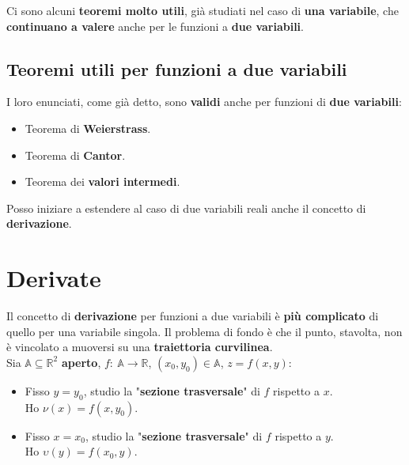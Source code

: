 \documentclass[a4paper, oneside]{article}
\newcommand\R{\mathbb{R}}
\newcommand\A{\mathbb{A}}
\def\potatoshape{
  (1,0) (2,1.5) (1.6,3) (0.3,2.7) (-0.4,1.2)
}
\newcommand{\potato}[3][draw=white]{
  \begin{scope}[shift={#2}, scale=#3]
    \draw[#1]
      plot [smooth cycle, tension=1]
      coordinates {\potatoshape};
  \end{scope}
}
\begin{document}
    \noindent Ci sono alcuni \textbf{teoremi molto utili}, già studiati nel caso di \textbf{una variabile}, che \textbf{continuano a valere} anche per le funzioni a \textbf{due variabili}.

    \subsection{Teoremi utili per funzioni a due variabili}
    I loro enunciati, come già detto, sono \textbf{validi} anche per funzioni di \textbf{due variabili}:
    \begin{itemize}
        \item Teorema di \textbf{Weierstrass}.
        \item Teorema di \textbf{Cantor}.
        \item Teorema dei \textbf{valori intermedi}.
    \end{itemize}
    Posso iniziare a estendere al caso di due variabili reali anche il concetto di \textbf{derivazione}.

    \newpage

    \section{Derivate}
    Il concetto di \textbf{derivazione} per funzioni a due variabili è \textbf{più complicato} di quello per una variabile singola.
    Il problema di fondo è che il punto, stavolta, non è vincolato a muoversi su una \textbf{traiettoria curvilinea}.\\

    \noindent Sia $\A\subseteq\R^2$ \textbf{aperto}, $f: \ \A\to\R$, $(x_0,y_0)\in\A$, $z=f(x,y)$:\\ 
    \begin{center}
    \end{center}
    \begin{itemize}
        \item Fisso $y=y_0$, studio la "\textbf{sezione trasversale}" di $f$ rispetto a $x$.\\
        Ho $\nu(x) = f(x,y_0)$.
        \item Fisso $x=x_0$, studio la "\textbf{sezione trasversale}" di $f$ rispetto a $y$.\\
        Ho $\upsilon(y) = f(x_0,y)$.
    \end{itemize}
\end{document}
